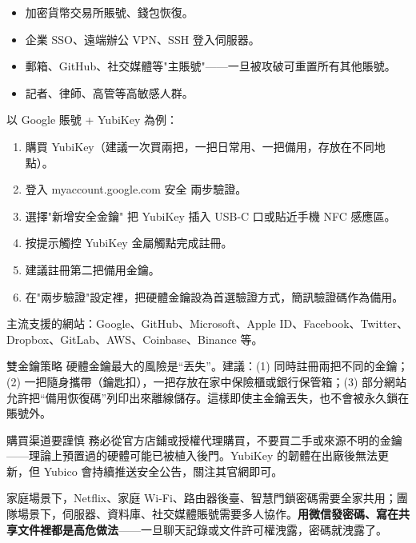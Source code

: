 
\begin{itemize}
  \item 加密貨幣交易所賬號、錢包恢復。
  \item 企業 SSO、遠端辦公 VPN、SSH 登入伺服器。
  \item 郵箱、GitHub、社交媒體等"主賬號"——一旦被攻破可重置所有其他賬號。
  \item 記者、律師、高管等高敏感人群。
\end{itemize}


以 Google 賬號 + YubiKey 為例：

\begin{enumerate}
  \item 購買 YubiKey（建議一次買兩把，一把日常用、一把備用，存放在不同地點）。
  \item 登入 myaccount.google.com 安全 兩步驗證。
  \item 選擇"新增安全金鑰" 把 YubiKey 插入 USB-C 口或貼近手機 NFC 感應區。
  \item 按提示觸控 YubiKey 金屬觸點完成註冊。
  \item 建議註冊第二把備用金鑰。
  \item 在"兩步驗證"設定裡，把硬體金鑰設為首選驗證方式，簡訊驗證碼作為備用。
\end{enumerate}

主流支援的網站：Google、GitHub、Microsoft、Apple ID、Facebook、Twitter、Dropbox、GitLab、AWS、Coinbase、Binance 等。

\begin{tcbinfo}{雙金鑰策略}
硬體金鑰最大的風險是“丟失”。建議：(1) 同時註冊兩把不同的金鑰；(2) 一把隨身攜帶（鑰匙扣），一把存放在家中保險櫃或銀行保管箱；(3) 部分網站允許把“備用恢復碼”列印出來離線儲存。這樣即使主金鑰丟失，也不會被永久鎖在賬號外。

\end{tcbinfo}

\begin{tcbwarn}{購買渠道要謹慎}
務必從官方店鋪或授權代理購買，不要買二手或來源不明的金鑰——理論上預置過的硬體可能已被植入後門。YubiKey 的韌體在出廠後無法更新，但 Yubico 會持續推送安全公告，關注其官網即可。

\end{tcbwarn}


家庭場景下，Netflix、家庭 Wi-Fi、路由器後臺、智慧門鎖密碼需要全家共用；團隊場景下，伺服器、資料庫、社交媒體賬號需要多人協作。\textbf{用微信發密碼、寫在共享文件裡都是高危做法}——一旦聊天記錄或文件許可權洩露，密碼就洩露了。

